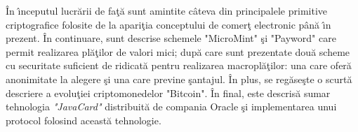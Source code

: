 \documentclass[]{scrartcl}
\newcommand\tab[1][0.7cm]{\hspace*{#1}}
\begin{document}
\tab \^{I}n \^{\i}nceputul lucr\u{a}rii de fa\c{t}\u{a} sunt amintite c\^{a}teva din principalele primitive criptografice folosite de la apari\c{t}ia conceptului de comer\c{t} electronic p\^{a}n\u{a} \^{\i}n prezent. \^{I}n continuare, sunt descrise schemele "MicroMint" \c{s}i "Payword" care permit realizarea pl\u{a}\c{t}ilor de valori mici; dup\u{a} care sunt prezentate dou\u{a} scheme cu securitate suficient de ridicat\u{a} pentru realizarea macropl\u{a}\c{t}ilor:  una care ofer\u{a} anonimitate la alegere \c{s}i una care previne \c{s}antajul. \^{I}n plus, se reg\u{a}se\c{s}te o scurt\u{a} descriere a evolu\c{t}iei criptomonedelor "Bitcoin". \^{I}n final, este descris\u{a} sumar tehnologia \textit{"JavaCard"} distribuit\u{a} de compania Oracle \c{s}i implementarea unui protocol folosind aceast\u{a} tehnologie.
\tab  
\end{document}
